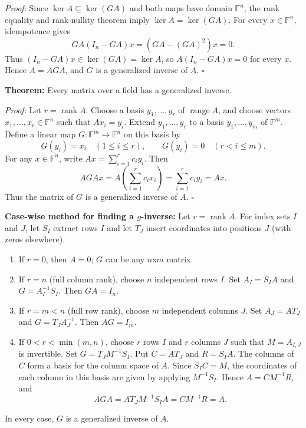 \documentclass[a4paper,11pt,abstract=true]{scrartcl}
\theoremstyle{dotlessP}
\theoremstyle{dotlessS}
\theoremstyle{remark}
\theoremstyle{definition}
\begin{document}
\begin{claim_box}
\textit{Proof:} Since $\ker A\subseteq\ker(GA)$ and both maps have
domain $\mathbb{F}^n$, the rank equality and rank-nullity theorem imply
$\ker A=\ker(GA)$. For every $x\in\mathbb{F}^n$, idempotence gives
\[
GA(I_n-GA)x=(GA-(GA)^2)x=0.
\]
Thus $(I_n-GA)x\in\ker(GA)=\ker A$, so $A(I_n-GA)x=0$ for every
$x$. Hence $A=AGA$, and $G$ is a generalized inverse of $A$.
\hfill$\square$
\end{claim_box}

\begin{problem_box}
\textbf{Theorem:} Every matrix over a field has a generalized inverse.
\end{problem_box}

\begin{claim_box}
\textit{Proof:} Let $r=\operatorname{rank}A$. Choose a basis
$y_1,\ldots,y_r$ of $\operatorname{range}A$, and choose vectors
$x_1,\ldots,x_r\in\mathbb{F}^n$ such that $Ax_i=y_i$. Extend
$y_1,\ldots,y_r$ to a basis $y_1,\ldots,y_m$ of $\mathbb{F}^m$.
Define a linear map $G:\mathbb{F}^m\to\mathbb{F}^n$ on this basis by
\[
G(y_i)=x_i\quad(1\leq i\leq r),
\qquad
G(y_i)=0\quad(r<i\leq m).
\]
For any $x\in\mathbb{F}^n$, write
$Ax=\sum_{i=1}^r c_i y_i$. Then
\[
AGA x=A\left(\sum_{i=1}^r c_i x_i\right)
=\sum_{i=1}^r c_i y_i=Ax.
\]
Thus the matrix of $G$ is a generalized inverse of $A$.
\hfill$\square$
\end{claim_box}
\begin{example_box}
\textbf{Case-wise method for finding a $g$-inverse:} Let
$r=\operatorname{rank}A$. For index sets $I$ and $J$, let $S_I$
extract rows $I$ and let $T_J$ insert coordinates into positions $J$
(with zeros elsewhere).
\begin{enumerate}
    \item If $r=0$, then $A=0$; $G$ can be any $n$x$m$ matrix.
    \item If $r=n$ (full column rank), choose $n$ independent rows $I$.
    Set $A_I=S_IA$ and $G=A_I^{-1}S_I$. Then $GA=I_n$.
    \item If $r=m<n$ (full row rank), choose $m$ independent columns $J$.
    Set $A_J=AT_J$ and $G=T_JA_J^{-1}$. Then $AG=I_m$.
    \item If $0<r<\min(m,n)$, choose $r$ rows $I$ and $r$ columns
    $J$ such that $M=A_{I,J}$ is invertible. Set
    $G=T_JM^{-1}S_I$. Put $C=AT_J$ and $R=S_IA$. The columns of $C$
    form a basis for the column space of $A$. Since $S_IC=M$, the
    coordinates of each column in this basis are given by applying
    $M^{-1}S_I$. Hence $A=CM^{-1}R$, and
    \[
    AGA=AT_JM^{-1}S_IA=CM^{-1}R=A.
    \]
\end{enumerate}
In every case, $G$ is a generalized inverse of $A$.
\end{example_box}
\end{document}
